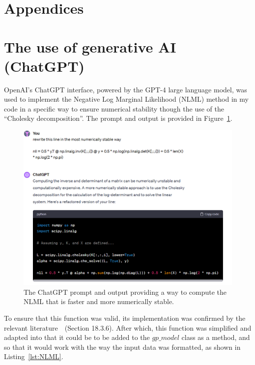\appendix
\section*{Appendices}
\renewcommand{\thelstlisting}{\thesection.\arabic{lstlisting}}
\setcounter{lstlisting}{0}
\section{The use of generative AI (ChatGPT)}
\label{app:GPT}
OpenAI's ChatGPT interface, powered by the GPT-4 large language model, was used to implement the Negative Log Marginal Likelihood (NLML) method in my code in a specific way to ensure numerical stability though the use of the ``Cholesky decomposition''.
The prompt and output is provided in Figure~\ref{fig:chat-NLML}.
\begin{figure}[htbp]
    \centering
    \includegraphics[width=1\linewidth]{figures/chat-NLML/chat-NLML.png}
    \caption{The ChatGPT prompt and output providing a way to compute the NLML that is faster and more numerically stable.}
    \label{fig:chat-NLML}
\end{figure}

\FloatBarrier

To ensure that this function was valid, its implementation was confirmed by the relevant literature~\cite{murphy2023probabilistic}~(Section 18.3.6).
After which, this function was simplified and adapted into that it could be to be added to the $gp\_model$ class as a method, and so that it would work with the way the input data was formatted, as shown in Listing~\ref{lst:NLML}.

